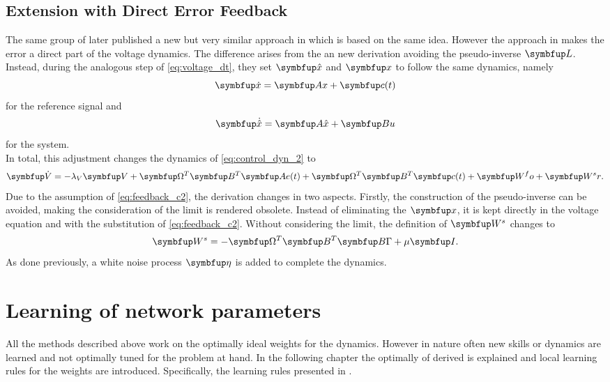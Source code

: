 \subsection{Extension with Direct Error Feedback}\label{ssec:extension}
The same group of \cite{huang_optimizing_2017} later published a new but very similar approach in \cite{huang_spiking_2019} which is based on the same idea. However the approach in \cite{huang_spiking_2019} makes the error a direct part of the voltage dynamics. The difference arises from the an new derivation avoiding the pseudo-inverse $\bmu{L}$.\\
Instead, during the analogous step of \cref{eq:voltage_dt}, they set $\bmu{\hat{x}}$ and $\bmu{x}$ to follow the same dynamics, namely
\begin{equation}\label{eq:feedback_c2}
	\bmu{\dot{x}} = \bmu{Ax} + \bmu{c}(t)
\end{equation}
for the reference signal and
\begin{equation}
	\bmu{\dot{\hat{x}}} = \bmu{A\hat{x}} + \bmu{Bu}
\end{equation}
for the system.\\
In total, this adjustment changes the dynamics of \cref{eq:control_dyn_2} to
\begin{equation}\label{eq:direct_error_voltage}
	\bmu{\dot{V}} = -\lambda_V\bmu{V} + \bmu{\Omega}^T \bmu{B}^T\bmu{Ae}(t) + \bmu{\Omega}^T \bmu{B}^T \bmu{c}(t) + \bmu{W^fo} + \bmu{W^sr}.
\end{equation}
Due to the assumption of \cref{eq:feedback_c2}, the derivation changes in two aspects. Firstly, the construction of the pseudo-inverse can be avoided, making the consideration of the limit is rendered obsolete. Instead of eliminating the $\bmu{x}$, it is kept directly in the voltage equation and with the substitution of \cref{eq:feedback_c2}. Without considering the limit, the definition of $\bmu{W}^s$ changes to
\begin{equation}
	\bmu{W^s} = -\bmu{\Omega}^T\bmu{B}^T\bmu{B\Gamma} + \mu\bmu{I}.
\end{equation}
As done previously, a white noise process $\bmu{\eta}$ is added to complete the dynamics.


\section{Learning of network parameters}\label{sec:learning}
All the methods described above work on the optimally ideal weights for the dynamics. However in nature often new skills or dynamics are learned and not optimally tuned for the problem at hand. In the following chapter the optimally of derived is explained and local learning rules for the weights are introduced. Specifically, the learning rules presented in \cite{bourdoukan_learning_2012,brendel_learning_2020,bourdoukan_enforcing_2015}.

